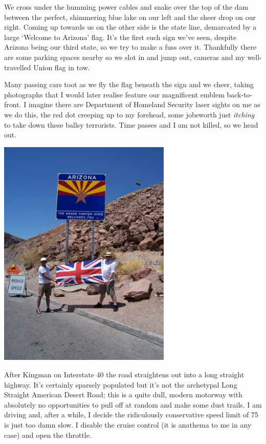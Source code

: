\documentclass[a5paper,titlepage,11pt]{book}
\begin{document}
We cross under the humming power cables and snake over the top of the dam between the perfect, shimmering blue lake on our left and the sheer drop on our right.  Coming up towards us on the other side is the state line, demarcated by a large `Welcome to Arizona' flag.  It's the first such sign we've seen, despite Arizona being our third state, so we try to make a fuss over it.  Thankfully there are some parking spaces nearby so we slot in and jump out, cameras and my well-travelled Union flag in tow.

Many passing cars toot as we fly the flag beneath the sign and we cheer, taking photographs that I would later realise feature our magnificent emblem back-to-front.  I imagine there are Department of Homeland Security laser sights on me as we do this, the red dot creeping up to my forehead, some jobsworth just \emph{itching} to take down these ballsy terrorists.  Time passes and I am not killed, so we head out.

\begin{center}\includegraphics[height=110mm]{gfx/100_1445}\end{center}

After Kingman on Interstate 40 the road straightens out into a long straight highway.  It's certainly sparsely populated but it's not the archetypal Long Straight American Desert Road; this is a quite dull, modern motorway with absolutely no opportunities to pull off at random and make some dust trails.  I am driving and, after a while, I decide the ridiculously conservative speed limit of 75 is just too damn slow.  I disable the cruise control (it is anathema to me in any case) and open the throttle.
\end{document}
